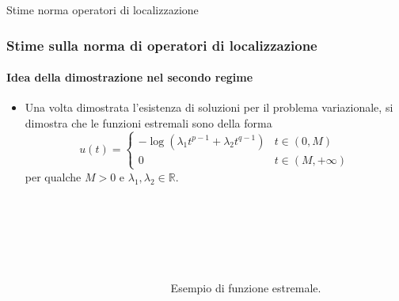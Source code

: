 \documentclass[aspectratio=141]{beamer}
\newcommand{\R}{\mathbb{R}} %
\newcommand{\emptyline}{\phantom{ }\\}
\begin{document}
\begin{section}{Stime norma operatori di localizzazione}
	\begin{frame}
		\frametitle{Stime sulla norma di operatori di localizzazione}
		\framesubtitle{Idea della dimostrazione nel secondo regime}
		\begin{itemize}
			\item Una volta dimostrata l'esistenza di soluzioni per il problema variazionale, si dimostra che le funzioni estremali sono della forma
			\begin{equation*}\label{expression u}
				u(t) = \begin{cases}
					-\log\left(\lambda_1 t^{p-1} + \lambda_2 t^{q-1}\right) & t \in (0,M)\\
					0 & t \in (M,+\infty)
				\end{cases}
			\end{equation*}
			per qualche $M>0$ e $\lambda_1, \lambda_2 \in \R$.
		\end{itemize}
		\begin{columns}[onlytextwidth,T]
			\begin{column}{.45\linewidth}
				\begin{figure}
				\end{figure}
			\end{column}
			\begin{column}{.45\linewidth}
				\emptyline
				\emptyline
				\emptyline
				\emptyline
				\begin{flushleft}
					\hspace{-1cm}Esempio di funzione estremale.
				\end{flushleft}				
			\end{column}
		\end{columns}
		\begin{center}
			
		\end{center}
	\end{frame}


\end{section}
\end{document}
